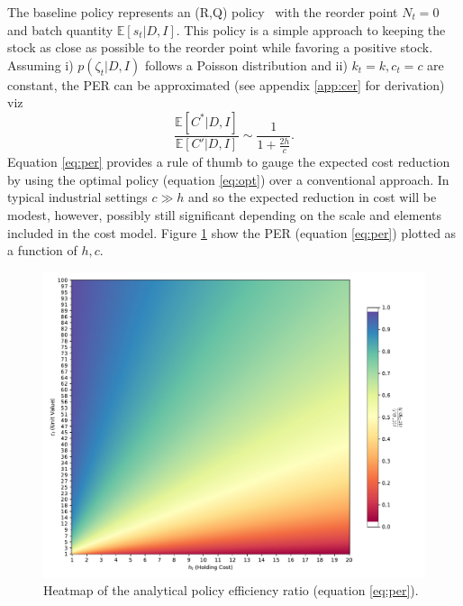 \documentclass[a4paper,12pt]{article}
\begin{document}
	The baseline policy represents an (R,Q) policy~\citep{bartmann1992inventory,axsaeter2006inventory} with the reorder point $N_t=0$ and batch quantity $\mathbb{E}[s_t|D,I]$. This policy is a simple approach to keeping the stock as close as possible to the reorder point while favoring a positive stock. Assuming i) $p(\zeta_t|D,I)$ follows a Poisson distribution and ii) $k_t=k,c_t=c$ are constant, the PER can be approximated (see appendix \ref{app:cer} for derivation) viz
	\begin{equation}
		\frac{\mathbb{E}[C^*|D,I] }{\mathbb{E}[C'|D,I]}\sim \frac{1}{1+\frac{2h}{c}}.
		\label{eq:per}
	\end{equation}
	Equation \eqref{eq:per} provides a rule of thumb to gauge the expected cost reduction by using the optimal policy (equation \eqref{eq:opt}) over a conventional approach. In typical industrial settings $c\gg h$ and so the expected reduction in cost will be modest, however, possibly still significant depending on the scale and elements included in the cost model. Figure \ref{fig:heatmap_analytical} show the PER (equation \eqref{eq:per}) plotted as a function of $h,c$.
	\begin{figure}[h!]
		\centering
		\includegraphics[width=\textwidth]{figures/analytical_heatmap.pdf}
		\caption{Heatmap of the analytical policy efficiency ratio (equation \eqref{eq:per}).}
		\label{fig:heatmap_analytical}
	\end{figure}
	
	
\end{document}
